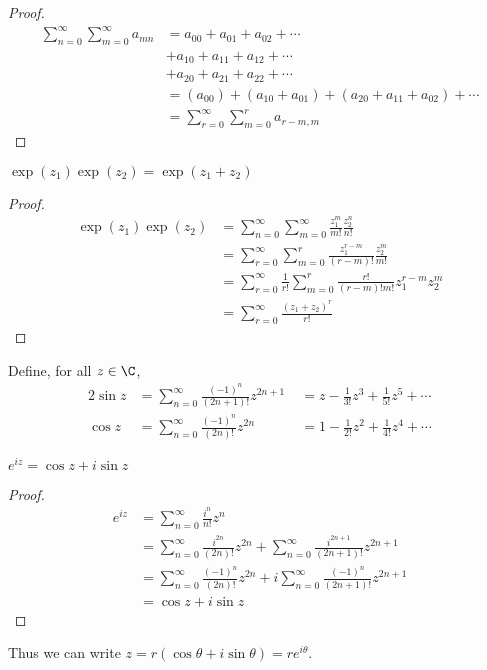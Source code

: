 \documentclass[a4paper]{article}
\begin{document}
\begin{proof}
  \begin{align*}
    \sum_{n = 0}^\infty\sum_{m = 0}^\infty a_{mn} &= a_{00} + a_{01} + a_{02} + \cdots\\
    &+ a_{10} + a_{11} + a_{12} + \cdots\\
    &+ a_{20} + a_{21} + a_{22} + \cdots\\
    &= (a_{00}) + (a_{10} + a_{01}) + (a_{20} + a_{11} + a_{02}) + \cdots\\
    &= \sum_{r = 0}^\infty\sum_{m = 0}^r a_{r - m, m}
  \end{align*}
\end{proof}
\begin{thm}
  $\exp(z_1)\exp(z_2) = \exp(z_1 + z_2)$
\end{thm}

\begin{proof}
  \begin{align*}
    \exp(z_1)\exp(z_2) &= \sum_{n = 0}^\infty\sum_{m = 0}^\infty \frac{z_1^m}{m!}\frac{z_2^n}{n!}\\
    &= \sum_{r = 0}^\infty\sum_{m = 0}^r \frac{z_1^{r - m}}{(r - m)!}\frac{z_2^m}{m!}\\
    &= \sum_{r = 0}^\infty\frac{1}{r!}\sum_{m = 0}^r \frac{r!}{(r - m)!m!}z_1^{r - m}z_2^m\\
    &= \sum_{r = 0}^\infty\frac{(z_1 + z_2)^r}{r!}
  \end{align*}
\end{proof}

\begin{defi}
  Define, for all $z\in \C$,
  \begin{alignat*}{2}
    \sin z &= \sum_{n=0}^\infty \frac{(-1)^n}{(2n+1)!}z^{2n+1} &\;= z - \frac{1}{3!}z^3 + \frac{1}{5!}z^5 + \cdots\\
    \cos z &= \sum_{n=0}^\infty \frac{(-1)^n}{(2n)!}z^{2n} &\;= 1 - \frac{1}{2!}z^2 + \frac{1}{4!}z^4 + \cdots
  \end{alignat*}
\end{defi}

\begin{thm}
  $e^{iz} = \cos z + i\sin z$
\end{thm}

\begin{proof}
  \begin{align*}
  e^{iz} &= \sum_{n=0}^\infty \frac{i^n}{n!}z^n\\
  &= \sum_{n=0}^\infty \frac{i^{2n}}{(2n)!}z^{2n} + \sum_{n=0}^\infty \frac{i^{2n+1}}{(2n+1)!}z^{2n+1}\\
  &= \sum_{n=0}^\infty \frac{(-1)^n}{(2n)!}z^{2n} + i \sum_{n=0}^\infty \frac{(-1)^n}{(2n+1)!}z^{2n+1}\\
  &= \cos z + i\sin z
  \end{align*}
\end{proof}
Thus we can write $z = r(\cos\theta + i\sin\theta) = re^{i\theta}$.
\end{document}
